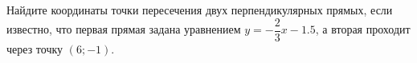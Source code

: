 \begin{ex}
	\begin{condition}
		Найдите координаты точки пересечения двух перпендикулярных прямых, если известно, что первая прямая задана уравнением \( y=-\dfrac{2}{3}x-1.5 \), а вторая проходит через точку \( (6;-1) \).
	\end{condition}
\end{ex}